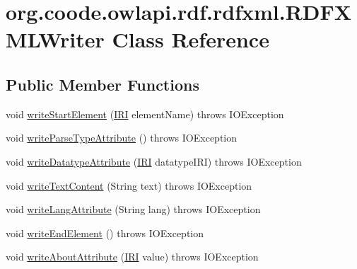\hypertarget{classorg_1_1coode_1_1owlapi_1_1rdf_1_1rdfxml_1_1_r_d_f_x_m_l_writer}{\section{org.\-coode.\-owlapi.\-rdf.\-rdfxml.\-R\-D\-F\-X\-M\-L\-Writer Class Reference}
\label{classorg_1_1coode_1_1owlapi_1_1rdf_1_1rdfxml_1_1_r_d_f_x_m_l_writer}
}
\subsection*{Public Member Functions}
\begin{DoxyCompactItemize}
\item 
void \hyperlink{classorg_1_1coode_1_1owlapi_1_1rdf_1_1rdfxml_1_1_r_d_f_x_m_l_writer_a77a3b36a4b4eb4ef70c6e18ec260ca36}{write\-Start\-Element} (\hyperlink{classorg_1_1semanticweb_1_1owlapi_1_1model_1_1_i_r_i}{I\-R\-I} element\-Name)  throws I\-O\-Exception 
\item 
void \hyperlink{classorg_1_1coode_1_1owlapi_1_1rdf_1_1rdfxml_1_1_r_d_f_x_m_l_writer_a6e025e1e9d6a82503aa9c8ca3300be41}{write\-Parse\-Type\-Attribute} ()  throws I\-O\-Exception  
\item 
void \hyperlink{classorg_1_1coode_1_1owlapi_1_1rdf_1_1rdfxml_1_1_r_d_f_x_m_l_writer_a23ea3a032961875b5640eedef64f9cdf}{write\-Datatype\-Attribute} (\hyperlink{classorg_1_1semanticweb_1_1owlapi_1_1model_1_1_i_r_i}{I\-R\-I} datatype\-I\-R\-I)  throws I\-O\-Exception  
\item 
void \hyperlink{classorg_1_1coode_1_1owlapi_1_1rdf_1_1rdfxml_1_1_r_d_f_x_m_l_writer_a6d7bd54f264269160c31322b07377fae}{write\-Text\-Content} (String text)  throws I\-O\-Exception  
\item 
void \hyperlink{classorg_1_1coode_1_1owlapi_1_1rdf_1_1rdfxml_1_1_r_d_f_x_m_l_writer_a121324d67545a5099f1ffea20b194ab6}{write\-Lang\-Attribute} (String lang)  throws I\-O\-Exception 
\item 
void \hyperlink{classorg_1_1coode_1_1owlapi_1_1rdf_1_1rdfxml_1_1_r_d_f_x_m_l_writer_a04b6685d90e5238db7a33f4826e523af}{write\-End\-Element} ()  throws I\-O\-Exception  
\item 
void \hyperlink{classorg_1_1coode_1_1owlapi_1_1rdf_1_1rdfxml_1_1_r_d_f_x_m_l_writer_aec3340ead37093a04dfe1a3c3c76d49e}{write\-About\-Attribute} (\hyperlink{classorg_1_1semanticweb_1_1owlapi_1_1model_1_1_i_r_i}{I\-R\-I} value)  throws I\-O\-Exception  

\end{DoxyCompactItemize}
